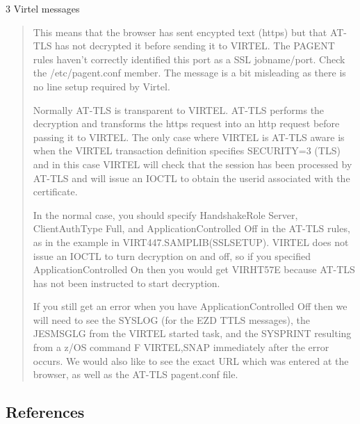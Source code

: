 \documentclass[letterpaper,10pt,english]{sphinxmanual}
\begin{document}
3   Virtel messages
\begin{quote}


This means that the browser has sent encypted text (https) but that AT-TLS has not decrypted it before sending it to VIRTEL. The PAGENT rules haven’t correctly identified this port as a SSL jobname/port. Check the /etc/pagent.conf member. The message is a bit misleading as there is no line setup required by Virtel.

Normally AT-TLS is transparent to VIRTEL. AT-TLS performs the decryption and transforms the https request into an http request before passing it to VIRTEL. The only case where VIRTEL is AT-TLS aware is when the VIRTEL transaction definition specifies SECURITY=3 (TLS) and in this case VIRTEL will check that the session has been processed by AT-TLS and will issue an IOCTL to obtain the userid associated with the certificate.

In the normal case, you should specify HandshakeRole Server, ClientAuthType Full, and ApplicationControlled Off in the AT-TLS rules, as in the example in VIRT447.SAMPLIB(SSLSETUP). VIRTEL does not issue an IOCTL to turn decryption on and off, so if you specified ApplicationControlled On then you would get VIRHT57E because AT-TLS has not been instructed to start decryption.

If you still get an error when you have ApplicationControlled Off then we will need to see the SYSLOG (for the EZD TTLS messages), the JESMSGLG from the VIRTEL started task, and the SYSPRINT resulting from a z/OS command F VIRTEL,SNAP immediately after the error occurs. We would also like to see the exact URL which was entered at the browser, as well as the AT-TLS pagent.conf file.
\end{quote}


\subsection{References}
\label{\detokenize{Customization:references}}
\end{document}
